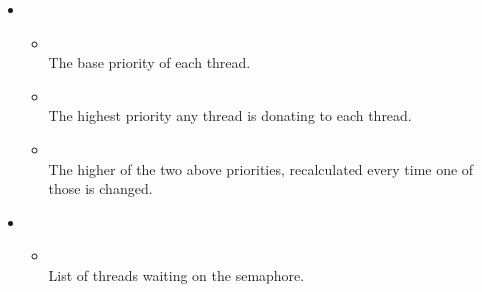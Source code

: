 \begin{itemize}

\item {} \begin{itemize}
		\item {}\\The base priority of each thread.
		\item {}\\The highest priority any thread is donating to each thread.
		\item {}\\The higher of the two above priorities, recalculated every time one of those is changed.
\end{itemize}

\item {} \begin{itemize}
	\item {}\\List of threads waiting on the semaphore.
\end{itemize}

\end{itemize}


